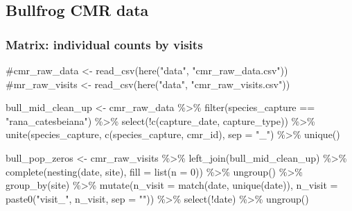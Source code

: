 \documentclass[
  letterpaper,
  DIV=11,
  numbers=noendperiod]{scrartcl}
\newenvironment{Shaded}{\begin{snugshade}}{\end{snugshade}}
\newcommand{\AttributeTok}[1]{\textcolor[rgb]{0.40,0.45,0.13}{#1}}
\newcommand{\CommentTok}[1]{\textcolor[rgb]{0.37,0.37,0.37}{#1}}
\newcommand{\DecValTok}[1]{\textcolor[rgb]{0.68,0.00,0.00}{#1}}
\newcommand{\FunctionTok}[1]{\textcolor[rgb]{0.28,0.35,0.67}{#1}}
\newcommand{\NormalTok}[1]{\textcolor[rgb]{0.00,0.23,0.31}{#1}}
\newcommand{\OtherTok}[1]{\textcolor[rgb]{0.00,0.23,0.31}{#1}}
\newcommand{\SpecialCharTok}[1]{\textcolor[rgb]{0.37,0.37,0.37}{#1}}
\newcommand{\StringTok}[1]{\textcolor[rgb]{0.13,0.47,0.30}{#1}}
\begin{document}
\hypertarget{bullfrog-cmr-data}{%
\subsection{Bullfrog CMR data}\label{bullfrog-cmr-data}}

\hypertarget{matrix-individual-counts-by-visits}{%
\subsubsection{Matrix: individual counts by
visits}\label{matrix-individual-counts-by-visits}}

\begin{Shaded}
\begin{Highlighting}[]
\CommentTok{\#cmr\_raw\_data \textless{}{-} read\_csv(here("data", "cmr\_raw\_data.csv"))}
\CommentTok{\#mr\_raw\_visits \textless{}{-} read\_csv(here("data", "cmr\_raw\_visits.csv"))}

\NormalTok{bull\_mid\_clean\_up }\OtherTok{\textless{}{-}}\NormalTok{ cmr\_raw\_data }\SpecialCharTok{\%\textgreater{}\%} 
  \FunctionTok{filter}\NormalTok{(species\_capture }\SpecialCharTok{==} \StringTok{"rana\_catesbeiana"}\NormalTok{) }\SpecialCharTok{\%\textgreater{}\%} 
  \FunctionTok{select}\NormalTok{(}\SpecialCharTok{!}\FunctionTok{c}\NormalTok{(capture\_date, capture\_type)) }\SpecialCharTok{\%\textgreater{}\%} 
  \FunctionTok{unite}\NormalTok{(species\_capture, }\FunctionTok{c}\NormalTok{(species\_capture, cmr\_id), }\AttributeTok{sep =} \StringTok{"\_"}\NormalTok{) }\SpecialCharTok{\%\textgreater{}\%} 
  \FunctionTok{unique}\NormalTok{() }
  
\NormalTok{bull\_pop\_zeros }\OtherTok{\textless{}{-}}\NormalTok{ cmr\_raw\_visits }\SpecialCharTok{\%\textgreater{}\%} 
  \FunctionTok{left\_join}\NormalTok{(bull\_mid\_clean\_up) }\SpecialCharTok{\%\textgreater{}\%}
  \FunctionTok{complete}\NormalTok{(}\FunctionTok{nesting}\NormalTok{(date, site), }
           \AttributeTok{fill =} \FunctionTok{list}\NormalTok{(}\AttributeTok{n =} \DecValTok{0}\NormalTok{)) }\SpecialCharTok{\%\textgreater{}\%} 
  \FunctionTok{ungroup}\NormalTok{() }\SpecialCharTok{\%\textgreater{}\%} 
  \FunctionTok{group\_by}\NormalTok{(site) }\SpecialCharTok{\%\textgreater{}\%} 
  \FunctionTok{mutate}\NormalTok{(}\AttributeTok{n\_visit =} \FunctionTok{match}\NormalTok{(date, }\FunctionTok{unique}\NormalTok{(date)),}
         \AttributeTok{n\_visit =} \FunctionTok{paste0}\NormalTok{(}\StringTok{"visit\_"}\NormalTok{, n\_visit, }\AttributeTok{sep =} \StringTok{""}\NormalTok{)) }\SpecialCharTok{\%\textgreater{}\%} 
  \FunctionTok{select}\NormalTok{(}\SpecialCharTok{!}\NormalTok{date) }\SpecialCharTok{\%\textgreater{}\%} 
  \FunctionTok{ungroup}\NormalTok{() }
\end{Highlighting}
\end{Shaded}
\end{document}
